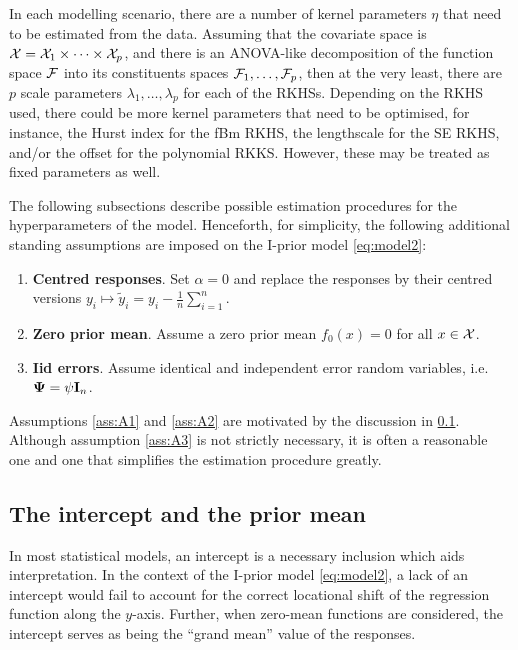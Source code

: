 In each modelling scenario, there are a number of kernel parameters $\eta$ that need to be estimated from the data.
Assuming that the covariate space is ${\mathcal X} = {\mathcal X}_1\times\cdots\times{\mathcal X}_p$, and there is an ANOVA-like decomposition of the function space ${\mathcal F}$ into its constituents spaces ${\mathcal F}_1,\dots,{\mathcal F}_p$, then at the very least, there are $p$ scale parameters $\lambda_1,\dots,\lambda_p$ for each of the RKHSs.
Depending on the RKHS used, there could be more kernel parameters that need to be optimised, for instance, the Hurst index for the fBm RKHS, the lengthscale for the SE RKHS, and/or the offset for the polynomial RKKS.
However, these may be treated as fixed parameters as well.

The following subsections describe possible estimation procedures for the hyperparameters of the model.
Henceforth, for simplicity, the following additional standing assumptions are imposed on the I-prior model \cref{eq:model2}:
\begin{enumerate}[label=A\arabic*,ref=A\arabic*]
  \item \textbf{Centred responses}. Set $\alpha = 0$ and replace the responses by their centred versions $y_i \mapsto \tilde y_i = y_i - \frac{1}{n}\sum_{i=1}^n$. \label{ass:A1}  
  \item \textbf{Zero prior mean}. Assume a zero prior mean $f_0(x) = 0$ for all $x\in{\mathcal X}$. \label{ass:A2} 
  \item \textbf{Iid errors}. Assume identical and independent error random variables, i.e. ${\bm\Psi} = \psi{\mathbf I}_n$. \label{ass:A3} 
\end{enumerate}
Assumptions \ref{ass:A1} and \ref{ass:A2} are motivated by the discussion in \cref{sec:intercept}.
Although assumption \ref{ass:A3} is not strictly necessary, it is often a reasonable one and one that simplifies the estimation procedure greatly.

\vspace{-0.25em}
\subsection{The intercept and the prior mean}\label{sec:intercept}
\vspace{-0.25em}
In most statistical models, an intercept is a necessary inclusion which aids interpretation.
In the context of the I-prior model \cref{eq:model2}, a lack of an intercept would fail to account for the correct locational shift of the regression function along the $y$-axis.
Further, when zero-mean functions are considered, the intercept serves as being the ``grand mean'' value of the responses.

